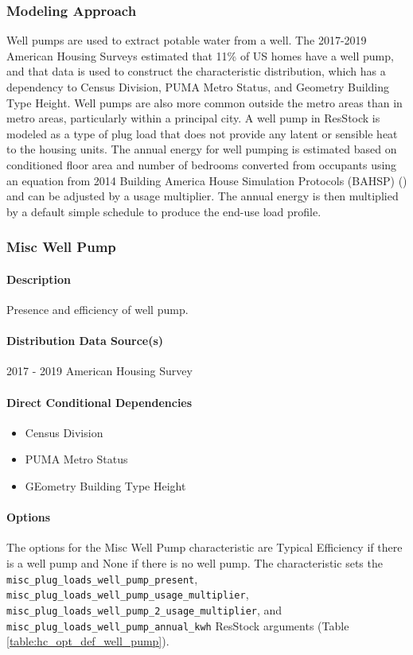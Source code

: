 \subsubsection{Modeling Approach}
Well pumps are used to extract potable water from a well. The 2017-2019 American Housing Surveys estimated that 11\% of US homes have a well pump, and that data is used to construct the characteristic distribution, which has a dependency to Census Division, PUMA Metro Status, and Geometry Building Type Height. Well pumps are also more common outside the metro areas than in metro areas, particularly within a principal city. A well pump in ResStock is modeled as a type of plug load that does not provide any latent or sensible heat to the housing units. The annual energy for well pumping is estimated based on conditioned floor area and number of bedrooms converted from occupants using an equation from 2014 Building America House Simulation Protocols (BAHSP) (\cite{Wilson2014}) and can be adjusted by a usage multiplier. The annual energy is then multiplied by a default simple schedule to produce the end-use load profile. 

\subsubsection{Misc Well Pump}
\paragraph{Description}
Presence and efficiency of well pump.

\paragraph{Distribution Data Source(s)}
2017 - 2019 American Housing Survey
\paragraph{Direct Conditional Dependencies}
\begin{itemize}
    \item Census Division
    \item PUMA Metro Status
    \item GEometry Building Type Height
\end{itemize}

\paragraph{Options}
The options for the Misc Well Pump characteristic are Typical Efficiency if there is a well pump and None if there is no well pump. The characteristic sets the \texttt{misc\_plug\_loads\_well\_pump\_present}, \texttt{misc\_plug\_loads\_well\_pump\_usage\_multiplier}, \texttt{misc\_plug\_loads\_well\_pump\_2\_usage\_multiplier}, and \texttt{misc\_plug\_loads\_well\_pump\_annual\_kwh} ResStock arguments (Table \ref{table:hc_opt_def_well_pump}). 

